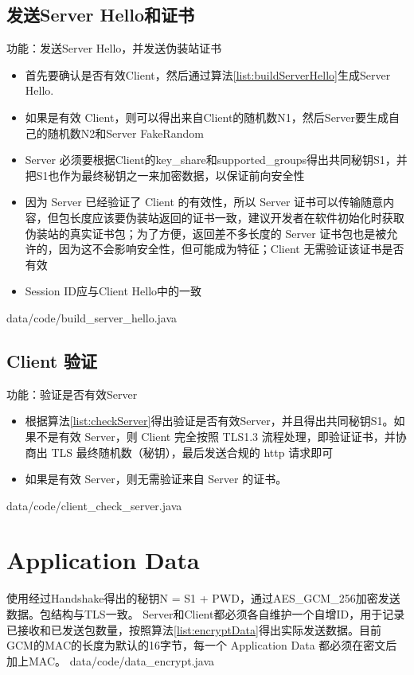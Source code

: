 \subsection{发送Server Hello和证书}
功能：发送Server Hello，并发送伪装站证书
\begin{itemize}
	\item 首先要确认是否有效Client，然后通过算法\ref{list:buildServerHello}生成Server Hello.
	\item 如果是有效 Client，则可以得出来自Client的随机数N1，然后Server要生成自己的随机数N2和Server FakeRandom
	\item Server 必须要根据Client的key\_share和supported\_groups得出共同秘钥S1，并把S1也作为最终秘钥之一来加密数据，以保证前向安全性
	\item 因为 Server 已经验证了 Client 的有效性，所以 Server 证书可以传输随意内容，但包长度应该要伪装站返回的证书一致，建议开发者在软件初始化时获取伪装站的真实证书包；为了方便，返回差不多长度的 Server 证书包也是被允许的，因为这不会影响安全性，但可能成为特征；Client 无需验证该证书是否有效
	\item Session ID应与Client Hello中的一致
\end{itemize}
 {data/code/build_server_hello.java}

\subsection{Client 验证}
功能：验证是否有效Server
\begin{itemize}
	\item 根据算法\ref{list:checkServer}得出验证是否有效Server，并且得出共同秘钥S1。如果不是有效 Server，则 Client 完全按照 TLS1.3 流程处理，即验证证书，并协商出 TLS 最终随机数（秘钥），最后发送合规的 http 请求即可
	\item 如果是有效 Server，则无需验证来自 Server 的证书。
\end{itemize}
 {data/code/client_check_server.java}

\section{Application Data}
使用经过Handshake得出的秘钥N = S1 + PWD，通过AES\_GCM\_256加密发送数据。包结构与TLS一致。
Server和Client都必须各自维护一个自增ID，用于记录已接收和已发送包数量，按照算法\ref{list:encryptData}得出实际发送数据。目前GCM的MAC的长度为默认的16字节，每一个 Application Data 都必须在密文后加上MAC。
 {data/code/data_encrypt.java}
